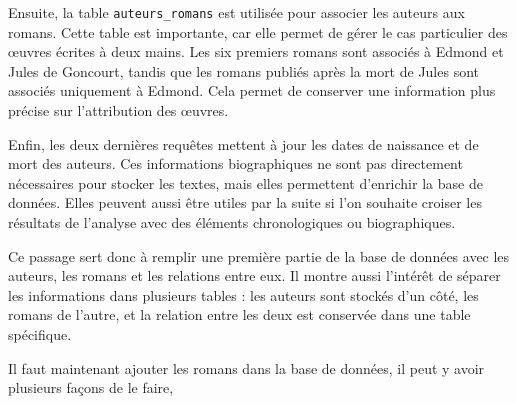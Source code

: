 Ensuite, la table \texttt{auteurs\_romans} est utilisée pour associer les auteurs aux romans. Cette table est importante, car elle permet de gérer le cas particulier des œuvres écrites à deux mains. Les six premiers romans sont associés à Edmond et Jules de Goncourt, tandis que les romans publiés après la mort de Jules sont associés uniquement à Edmond. Cela permet de conserver une information plus précise sur l'attribution des œuvres.

Enfin, les deux dernières requêtes mettent à jour les dates de naissance et de mort des auteurs. Ces informations biographiques ne sont pas directement nécessaires pour stocker les textes, mais elles permettent d'enrichir la base de données. Elles peuvent aussi être utiles par la suite si l'on souhaite croiser les résultats de l'analyse avec des éléments chronologiques ou biographiques.

Ce passage sert donc à remplir une première partie de la base de données avec les auteurs, les romans et les relations entre eux. Il montre aussi l'intérêt de séparer les informations dans plusieurs tables : les auteurs sont stockés d'un côté, les romans de l'autre, et la relation entre les deux est conservée dans une table spécifique.

Il faut maintenant ajouter les romans dans la base de données, il peut y avoir plusieurs façons de le faire, 
